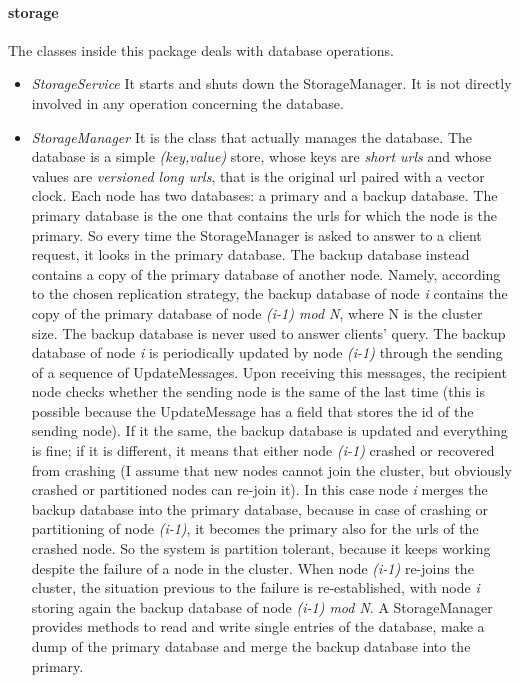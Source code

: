 \documentclass{article}
\begin{document}
\paragraph{storage} The classes inside this package deals with database operations.
\begin{itemize}
\item \textit{StorageService} It starts and shuts down the StorageManager. It is not directly involved in any operation concerning the database.
\item \textit{StorageManager} It is the class that actually manages the database. The database is a simple \textit{(key,value)} store, whose keys are \textit{short urls} and whose values are \textit{versioned long urls}, that is the original url paired with a vector clock. Each node has two databases: a primary and a backup database. The primary database is the one that contains the urls for which the node is the primary. So every time the StorageManager is asked to answer to a client request, it looks in the primary database. The backup database instead contains a copy of the primary database of another node. Namely, according to the chosen replication strategy, the backup database of node \textit{i} contains the copy of the primary database of node \textit{(i-1) mod N}, where N is the cluster size. The backup database is never used to answer clients' query. The backup database of node \textit{i} is periodically updated by node \textit{(i-1)} through the sending of a sequence of UpdateMessages. Upon receiving this messages, the recipient node checks whether the sending node is the same of the last time (this is possible because the UpdateMessage has a field that stores the id of the sending node). If it the same, the backup database is updated and everything is fine; if it is different, it means that either node \textit{(i-1)} crashed or recovered from crashing (I assume that new nodes cannot join the cluster, but obviously crashed or partitioned nodes can re-join it). In this case node \textit{i} merges the backup database into the primary database, because in case of crashing or partitioning of node \textit{(i-1)}, it becomes the primary also for the urls of the crashed node. So the system is partition tolerant, because it keeps working despite the failure of a node in the cluster. When node \textit{(i-1)} re-joins the cluster, the situation previous to the failure is re-established, with node \textit{i} storing again the backup database of node \textit{(i-1) mod N}. A StorageManager provides methods to read and write single entries of the database, make a dump of the primary database and merge the backup database into the primary. 
\end{itemize}
\end{document}
